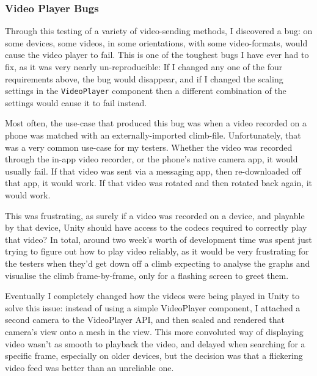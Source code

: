 \subsubsection{Video Player Bugs}
Through this testing of a variety of video-sending methods, I discovered a bug:
on some devices, some videos, in some orientations, with some video-formats, would cause the video player to fail.
This is one of the toughest bugs I have ever had to fix, as it was very nearly un-reproducible: If I changed any one of the four requirements above, the bug would disappear, and if I changed the scaling settings in the \verb|VideoPlayer| component then a different combination of the settings would cause it to fail instead.

Most often, the use-case that produced this bug was when a video recorded on a phone was matched with an externally-imported climb-file.
Unfortunately, that was a very common use-case for my testers.
Whether the video was recorded through the in-app video recorder, or the phone's native camera app, it would usually fail.
If that video was sent via a messaging app, then re-downloaded off that app, it would work.
If that video was rotated and then rotated back again, it would work.

This was frustrating, as surely if a video was recorded on a device, and playable by that device, Unity should have access to the codecs required to correctly play that video?
In total, around two week's worth of development time was spent just trying to figure out how to play video reliably, as it would be very frustrating for the testers when they'd get down off a climb expecting to analyse the graphs and visualise the climb frame-by-frame, only for a flashing screen to greet them.

Eventually I completely changed how the videos were being played in Unity to solve this issue: instead of using a simple VideoPlayer component, I attached a second camera to the VideoPlayer API, and then scaled and rendered that camera's view onto a mesh in the view.
This more convoluted way of displaying video wasn't as smooth to playback the video, and delayed when searching for a specific frame, especially on older devices, but the decision was that a flickering video feed was better than an unreliable one.




